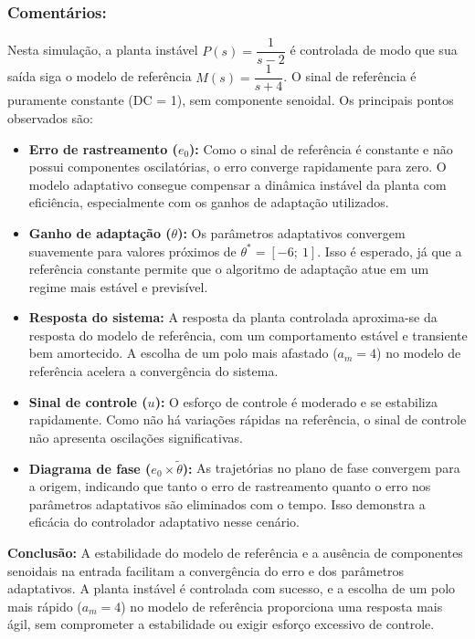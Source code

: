 \documentclass[10pt]{article}
\begin{document}
\subsubsection{Comentários:}

Nesta simulação, a planta instável $P(s) = \dfrac{1}{s - 2}$ é controlada de modo que sua saída siga o modelo de referência $M(s) = \dfrac{1}{s + 4}$. O sinal de referência é puramente constante (DC = 1), sem componente senoidal. Os principais pontos observados são:

\begin{itemize}
    \item \textbf{Erro de rastreamento ($e_0$):} Como o sinal de referência é constante e não possui componentes oscilatórias, o erro converge rapidamente para zero. O modelo adaptativo consegue compensar a dinâmica instável da planta com eficiência, especialmente com os ganhos de adaptação utilizados.

    \item \textbf{Ganho de adaptação ($\theta$):} Os parâmetros adaptativos convergem suavemente para valores próximos de $\theta^* = [-6;\ 1]$. Isso é esperado, já que a referência constante permite que o algoritmo de adaptação atue em um regime mais estável e previsível.

    \item \textbf{Resposta do sistema:} A resposta da planta controlada aproxima-se da resposta do modelo de referência, com um comportamento estável e transiente bem amortecido. A escolha de um polo mais afastado ($a_m = 4$) no modelo de referência acelera a convergência do sistema.

    \item \textbf{Sinal de controle ($u$):} O esforço de controle é moderado e se estabiliza rapidamente. Como não há variações rápidas na referência, o sinal de controle não apresenta oscilações significativas.

    \item \textbf{Diagrama de fase ($e_0 \times \tilde{\theta}$):} As trajetórias no plano de fase convergem para a origem, indicando que tanto o erro de rastreamento quanto o erro nos parâmetros adaptativos são eliminados com o tempo. Isso demonstra a eficácia do controlador adaptativo nesse cenário.
\end{itemize}

\textbf{Conclusão:} A estabilidade do modelo de referência e a ausência de componentes senoidais na entrada facilitam a convergência do erro e dos parâmetros adaptativos. A planta instável é controlada com sucesso, e a escolha de um polo mais rápido ($a_m = 4$) no modelo de referência proporciona uma resposta mais ágil, sem comprometer a estabilidade ou exigir esforço excessivo de controle.
\end{document}
